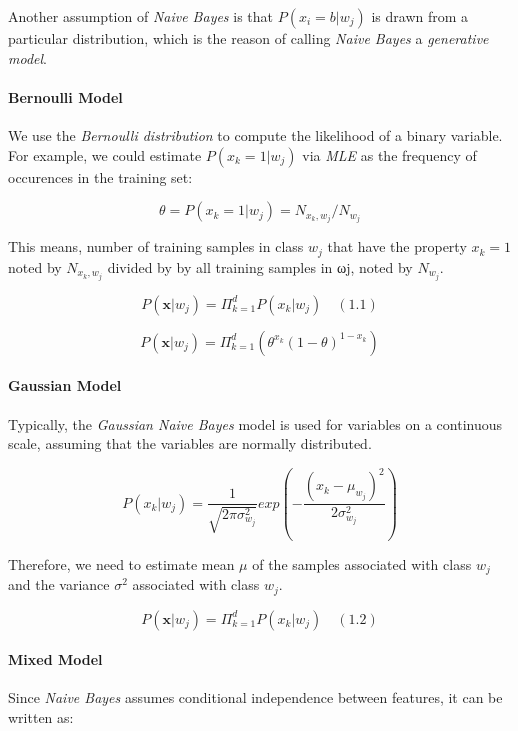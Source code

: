 \documentclass[11pt]{article}
\begin{document}
Another assumption of \emph{Naive Bayes} is that \(P(x_i=b|w_j)\) is
drawn from a particular distribution, which is the reason of calling
\emph{Naive Bayes} a \emph{generative model}.

    \hypertarget{bernoulli-model}{%
\paragraph{Bernoulli Model}\label{bernoulli-model}}

    We use the \emph{Bernoulli distribution} to compute the likelihood of a
binary variable. For example, we could estimate \(P(x_k=1 | w_j)\) via
\emph{MLE} as the frequency of occurences in the training set:

\[
\theta = P(x_k=1|w_j) = N_{x_k, w_j} / N_{w_j}
\]

This means, number of training samples in class \(w_j\) that have the
property \(x_k=1\) noted by \(N_{x_k, w_j}\) divided by by all training
samples in ωj, noted by \(N_{w_j}\).

\[
P(\mathbf{x}|w_j) = \Pi_{k=1}^{d}P(x_k|w_j) \quad (1.1)
\]

\[
P(\mathbf{x}|w_j) = \Pi_{k=1}^{d}(\theta^{x_k}(1-\theta)^{1-x_k})
\]

    \hypertarget{gaussian-model}{%
\paragraph{Gaussian Model}\label{gaussian-model}}

    Typically, the \emph{Gaussian Naive Bayes} model is used for variables
on a continuous scale, assuming that the variables are normally
distributed.

\[
P(x_k|w_j) = \frac{1}{\sqrt{2\pi\sigma_{w_j}^{2}}}exp(-\frac{(x_k - \mu_{w_j})^2}{2\sigma_{w_j}^{2}})
\]

Therefore, we need to estimate mean \(\mu\) of the samples associated
with class \(w_j\) and the variance \(\sigma^2\) associated with class
\(w_j\).

\[
P(\mathbf{x}|w_j) = \Pi_{k=1}^{d}P(x_k|w_j) \quad (1.2)
\]

    \hypertarget{mixed-model}{%
\paragraph{Mixed Model}\label{mixed-model}}

    Since \emph{Naive Bayes} assumes conditional independence between
features, it can be written as:
\end{document}
